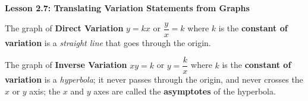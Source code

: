\begin{center}
\textbf{Lesson 2.7: Translating Variation Statements from Graphs}
\end{center}

\vspace*{1ex}

The graph of \textbf{Direct Variation} $ y = kx $ or $ \dfrac{y}{x} = k $ where $ k $ is the \textbf{constant of variation} is a \emph{straight line} that goes through the origin.

The graph of \textbf{Inverse Variation} $ xy = k $ or $ y = \dfrac{k}{x} $ where $k$ is the \textbf{constant of variation} is a \emph{hyperbola}; it never passes through the origin, and never crosses the $x$ or $y$ axis; the $x$ and $y$ axes are called the \textbf{asymptotes} of the hyperbola.


